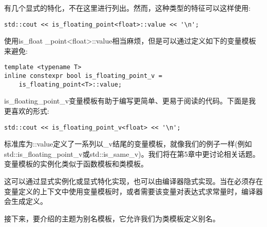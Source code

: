 有几个显式的特化，不在这里进行列出。然而，这种类型的特征可以这样使用:

\begin{lstlisting}[style=styleCXX]
std::cout << is_floating_point<float>::value << '\n';
\end{lstlisting}

使用is\_float \_point<float>::value相当麻烦，但是可以通过定义如下的变量模板来避免:

\begin{lstlisting}[style=styleCXX]
template <typename T>
inline constexpr bool is_floating_point_v =
	is_floating_point<T>::value;
\end{lstlisting}

is\_floating\_point\_v变量模板有助于编写更简单、更易于阅读的代码。下面是我更喜欢的形式:

\begin{lstlisting}[style=styleCXX]
std::cout << is_floating_point_v<float> << '\n';
\end{lstlisting}

标准库为::value定义了一系列以\_v结尾的变量模板，就像我们的例子一样(例如std::is\_floating\_point\_v或std::is\_same\_v)。我们将在第5章中更讨论相关话题。变量模板的实例化类似于函数模板和类模板。

这可以通过显式实例化或显式特化实现，也可以由编译器隐式实现。当在必须存在变量定义的上下文中使用变量模板时，或者需要该变量对表达式求常量时，编译器会生成定义。

接下来，要介绍的主题为别名模板，它允许我们为类模板定义别名。








